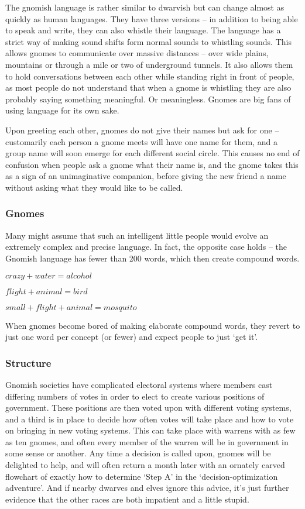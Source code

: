 \begin{multicols}{2}
The gnomish language is rather similar to dwarvish but can change almost as quickly as human languages.
They have three versions -- in addition to being able to speak and write, they can also whistle their language.
The language has a strict way of making sound shifts form normal sounds to whistling sounds.
This allows gnomes to communicate over massive distances -- over wide plains, mountains or through a mile or two of underground tunnels.
It also allows them to hold conversations between each other while standing right in front of people, as most people do not understand that when a gnome is whistling they are also probably saying something meaningful.
Or meaningless.
Gnomes are big fans of using language for its own sake. 

Upon greeting each other, gnomes do not give their names but ask for one -- customarily each person a gnome meets will have one name for them, and a group name will soon emerge for each different social circle. This causes no end of confusion when people ask a gnome what their name is, and the gnome takes this as a sign of an unimaginative companion, before giving the new friend a name without asking what they would like to be called.

\subsubsection{Gnomes}

Many might assume that such an intelligent little people would evolve an extremely complex and precise language.
In fact, the opposite case holds -- the Gnomish language has fewer than 200 words, which then create compound words.

$crazy + water = alcohol$

$flight + animal = bird$

$small + flight + animal = mosquito$

When gnomes become bored of making elaborate compound words, they revert to just one word per concept (or fewer) and expect people to just `get it'.

\subsubsection{Structure}

Gnomish societies have complicated electoral systems where members cast differing numbers of votes in order to elect to create various positions of government.
These positions are then voted upon with different voting systems, and a third is in place to decide how often votes will take place and how to vote on bringing in new voting systems.
This can take place with warrens with as few as ten gnomes, and often every member of the warren will be in government in some sense or another.
Any time a decision is called upon, gnomes will be delighted to help, and will often return a month later with an ornately carved flowchart of exactly how to determine `Step A' in the `decision-optimization adventure'.
And if nearby dwarves and elves ignore this advice, it's just further evidence that the other races are both impatient and a little stupid.


\end{multicols}
